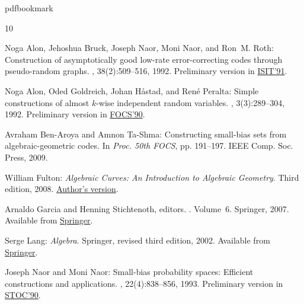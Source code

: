 %
%
%
%
%
\providecommand{\bibhead}[1]{}
%
\expandafter\ifx\csname pdfbookmark\endcsname\relax%
  \providecommand{\tocrefpdfbookmark}{}
\else\providecommand{\tocrefpdfbookmark}{%
   \hypertarget{tocreferences}{}%
   \pdfbookmark[1]{References}{tocreferences}}%
\fi

\tocrefpdfbookmark
\begin{thebibliography}{10}

\bibhead{ABNNR:92}
{\sc Noga Alon, Jehoshua Bruck, Joseph Naor, Moni Naor, and Ron~M. Roth}:
  Construction of asymptotically good low-rate error-correcting codes through
  pseudo-random graphs.
, 38(2):509--516, 1992.
\newblock Preliminary version in
  \href{http://dx.doi.org/10.1109/ISIT.1991.695195}{ISIT'91}.
\newblock [\epfmtdoi{10.1109/18.119713}]

\bibhead{AGHP:92}
{\sc Noga Alon, Oded Goldreich, Johan H{\aa}stad, and Ren\'{e} Peralta}: Simple
  constructions of almost $k$-wise independent random variables.
, 3(3):289--304, 1992.
\newblock Preliminary version in
  \href{http://dx.doi.org/10.1109/FSCS.1990.89575}{FOCS'90}.

\bibhead{focsversion}
{\sc Avraham Ben-Aroya and Amnon Ta-Shma}: Constructing small-bias sets from
  algebraic-geometric codes.
\newblock In {\em Proc. 50th FOCS}, pp. 191--197. IEEE Comp. Soc. Press, 2009.

\bibhead{F:08}
{\sc William Fulton}: {\em Algebraic Curves: An Introduction to Algebraic
  Geometry}.
\newblock Third edition, 2008.
\newblock \href{http://www.math.lsa.umich.edu/~wfulton/CurveBook.pdf}{Author's
  version}.

\bibhead{GS:06}
{\sc Arnaldo Garcia and Henning Stichtenoth}, editors.
.
\newblock Volume~6.
\newblock Springer, 2007.
\newblock Available from
  \href{http://www.springer.com/mathematics/numbers/book/978-1-4020-5333-7}{Springer}.

\bibhead{L:02}
{\sc Serge Lang}: {\em Algebra}.
\newblock Springer, revised third edition, 2002.
\newblock Available from
  \href{http://www.springer.com/mathematics/algebra/book/978-0-387-95385-4}{Springer}.

\bibhead{NN:93}
{\sc Joseph Naor and Moni Naor}: Small-bias probability spaces: Efficient
  constructions and applications.
, 22(4):838--856, 1993.
\newblock Preliminary version in
  \href{http://dx.doi.org/10.1145/100216.100244}{STOC'90}.
\newblock [\epfmtdoi{10.1137/0222053}]


\end{thebibliography}
